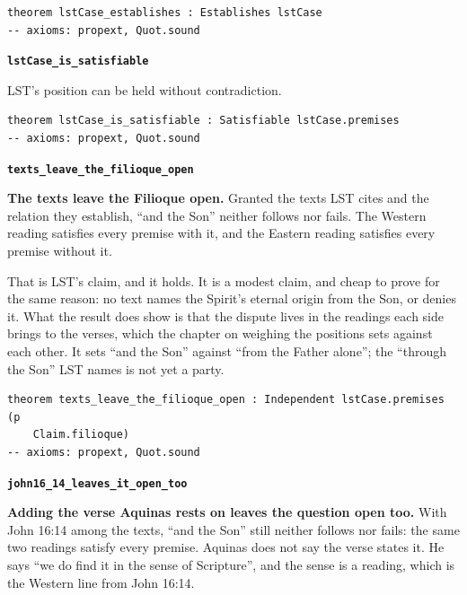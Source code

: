 \documentclass[11pt,paper=\testimonypaper,DIV=13,parskip=false]{scrartcl}
\begin{document}
{\small\begin{verbatim}
theorem lstCase_establishes : Establishes lstCase
-- axioms: propext, Quot.sound
\end{verbatim}}
\par\medskip\noindent\textbf{\texttt{lst\allowbreak{}Case\_\allowbreak{}is\_\allowbreak{}satisfiable}}\par\nobreak\noindent
LST’s position can be held without contradiction.

{\small\begin{verbatim}
theorem lstCase_is_satisfiable : Satisfiable lstCase.premises
-- axioms: propext, Quot.sound
\end{verbatim}}
\par\medskip\noindent\textbf{\texttt{texts\_\allowbreak{}leave\_\allowbreak{}the\_\allowbreak{}filioque\_\allowbreak{}open}}\par\nobreak\noindent
\textbf{The texts leave the Filioque open.} Granted the texts LST cites and the relation they establish, “and the Son” neither follows nor fails. The Western reading satisfies every premise with it, and the Eastern reading satisfies every premise without it.

That is LST’s claim, and it holds. It is a modest claim, and cheap to prove for the same reason: no text names the Spirit’s eternal origin from the Son, or denies it. What the result does show is that the dispute lives in the readings each side brings to the verses, which the chapter on weighing the positions sets against each other. It sets “and the Son” against “from the Father alone”; the “through the Son” LST names is not yet a party.

{\small\begin{verbatim}
theorem texts_leave_the_filioque_open : Independent lstCase.premises (p
    Claim.filioque)
-- axioms: propext, Quot.sound
\end{verbatim}}
\par\medskip\noindent\textbf{\texttt{john16\_\allowbreak{}14\_\allowbreak{}leaves\_\allowbreak{}it\_\allowbreak{}open\_\allowbreak{}too}}\par\nobreak\noindent
\textbf{Adding the verse Aquinas rests on leaves the question open too.} With John 16:14 among the texts, “and the Son” still neither follows nor fails: the same two readings satisfy every premise. Aquinas does not say the verse states it. He says “we do find it in the sense of Scripture”, and the sense is a reading, which is the Western line from John 16:14.
\end{document}
